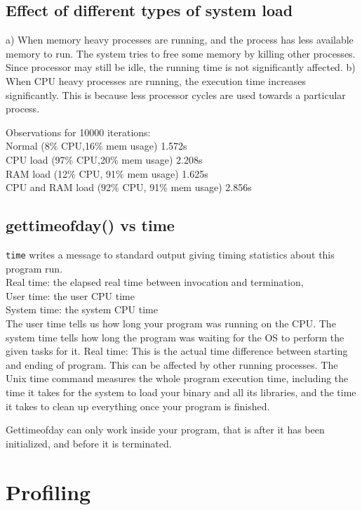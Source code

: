\documentclass[11pt,english]{article}
\begin{document}
\subsection{Effect of different types of system load}
\indent 
\par{a) When memory heavy processes are running, and the process has less available memory to run. The system tries to free some memory by killing other processes. Since processor may still be idle, the running time is not significantly affected. b) When CPU heavy processes are running, the execution time increases significantly. This is because less processor cycles are used towards a particular process.}
\indent 
\par{Observations for 10000 iterations: \\Normal (8\% CPU,16\% mem usage) 1.572s \\ CPU load (97\% CPU,20\% mem usage) 2.208s \\ RAM load (12\% CPU, 91\% mem usage) 1.625s \\ CPU and RAM load (92\% CPU, 91\% mem usage) 2.856s}
\subsection{gettimeofday() vs time}
\indent 
\par{\verb+time+ writes a message to standard output giving timing statistics about this program run. \\ Real time: the elapsed real time between invocation and termination, \\ User time: the user CPU time \\ System time: the system CPU time \\ The user time tells us how long your program was running on the CPU. The system time tells how long  the program was waiting for the OS to perform the given tasks for it. Real time: This is the actual time difference between starting and ending of program. This can be affected by other running processes. The Unix time command measures the whole program execution time, including the time it takes for the system to load your binary and all its libraries, and the time it takes to clean up everything once your program is finished.}
\indent 
\par{Gettimeofday can only work inside your program, that is after it has been initialized, and before it is terminated.}
\section{Profiling}
\end{document}

